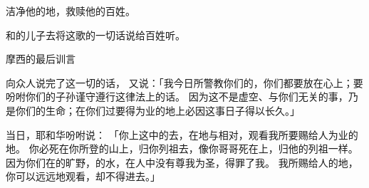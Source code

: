 {\par }{\Q 洁净他的地，救赎他的百姓。
\par }{\BB \par }{\PP {}和{}的儿子{}去将这歌的一切话说给百姓听。
\par }{\SH 摩西的最后训言
\par }{\PP {}向{}众人说完了这一切的话，
又说：「我今日所警教你们的，你们都要放在心上；要吩咐你们的子孙谨守遵行这律法上的话。
因为这不是虚空、与你们无关的事，乃是你们的生命；在你们过{}要得为业的地上必因这事日子得以长久。」
\par }{\PP {}当日，耶和华吩咐{}说：
「你上这{}中的{}去，在{}地与{}相对，观看我所要赐给{}人为业的{}地。
你必死在你所登的山上，归你列祖去，像你哥哥{}死在{}上，归他的列祖一样。
因为你们在{}的旷野，{}的{}水，在{}人中没有尊我为圣，得罪了我。
我所赐给{}人的地，你可以远远地观看，却不得进去。」

}
